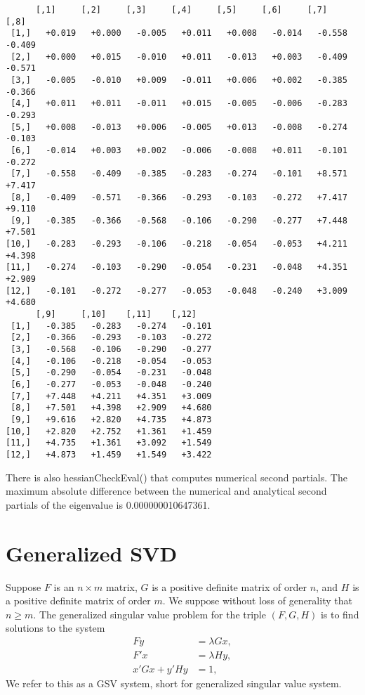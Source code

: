 \documentclass[
  12pt,
  letterpaper,
  DIV=11,
  numbers=noendperiod]{scrartcl}
\newcommand{\sectionbreak}{\clearpage}
\begin{document}
\begin{verbatim}
      [,1]     [,2]     [,3]     [,4]     [,5]     [,6]     [,7]     [,8]    
 [1,]   +0.019   +0.000   -0.005   +0.011   +0.008   -0.014   -0.558   -0.409
 [2,]   +0.000   +0.015   -0.010   +0.011   -0.013   +0.003   -0.409   -0.571
 [3,]   -0.005   -0.010   +0.009   -0.011   +0.006   +0.002   -0.385   -0.366
 [4,]   +0.011   +0.011   -0.011   +0.015   -0.005   -0.006   -0.283   -0.293
 [5,]   +0.008   -0.013   +0.006   -0.005   +0.013   -0.008   -0.274   -0.103
 [6,]   -0.014   +0.003   +0.002   -0.006   -0.008   +0.011   -0.101   -0.272
 [7,]   -0.558   -0.409   -0.385   -0.283   -0.274   -0.101   +8.571   +7.417
 [8,]   -0.409   -0.571   -0.366   -0.293   -0.103   -0.272   +7.417   +9.110
 [9,]   -0.385   -0.366   -0.568   -0.106   -0.290   -0.277   +7.448   +7.501
[10,]   -0.283   -0.293   -0.106   -0.218   -0.054   -0.053   +4.211   +4.398
[11,]   -0.274   -0.103   -0.290   -0.054   -0.231   -0.048   +4.351   +2.909
[12,]   -0.101   -0.272   -0.277   -0.053   -0.048   -0.240   +3.009   +4.680
      [,9]     [,10]    [,11]    [,12]   
 [1,]   -0.385   -0.283   -0.274   -0.101
 [2,]   -0.366   -0.293   -0.103   -0.272
 [3,]   -0.568   -0.106   -0.290   -0.277
 [4,]   -0.106   -0.218   -0.054   -0.053
 [5,]   -0.290   -0.054   -0.231   -0.048
 [6,]   -0.277   -0.053   -0.048   -0.240
 [7,]   +7.448   +4.211   +4.351   +3.009
 [8,]   +7.501   +4.398   +2.909   +4.680
 [9,]   +9.616   +2.820   +4.735   +4.873
[10,]   +2.820   +2.752   +1.361   +1.459
[11,]   +4.735   +1.361   +3.092   +1.549
[12,]   +4.873   +1.459   +1.549   +3.422
\end{verbatim}

There is also hessianCheckEval() that computes numerical second
partials. The maximum absolute difference between the numerical and
analytical second partials of the eigenvalue is 0.000000010647361.

\sectionbreak

\section{Generalized SVD}\label{sec-GSV}

Suppose \(F\) is an \(n\times m\) matrix, \(G\) is a positive definite
matrix of order \(n\), and \(H\) is a positive definite matrix of order
\(m\). We suppose without loss of generality that \(n\geq m\). The
generalized singular value problem for the triple \((F,G,H)\) is to find
solutions to the system \begin{subequations}
\begin{align}
Fy&=\lambda Gx,\label{eq-svd1}\\
F'x&=\lambda Hy,\label{eq-svd2}\\
x'Gx+y'Hy&=1,\label{eq-svd3}
\end{align}
\end{subequations} We refer to this as a GSV system, short for
generalized singular value system.
\end{document}
